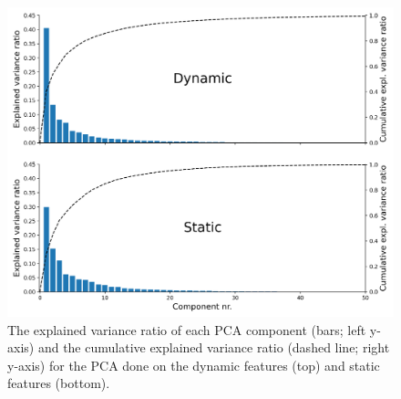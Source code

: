 \documentclass[12pt,american,a4paper,oneside,]{memoir} %
\begin{document}
\begin{figure}
\centering
\includegraphics{_bookdown_files/static-vs-dynamic-files/figures/figure_S1.pdf}
\caption{\label{fig:fig-svsd-S1}The explained variance ratio of each PCA component (bars; left y-axis) and the cumulative explained variance ratio (dashed line; right y-axis) for the PCA done on the dynamic features (top) and static features (bottom).}
\end{figure}
\end{document}
